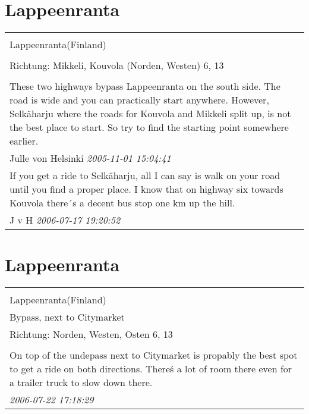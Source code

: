 \documentclass[a4paper,12pt]{article}
\begin{document}
\section{Lappeenranta}
\begin{tabular}{|p{13cm}|}
\hline\\
Lappeenranta(Finland)\\
\\
Richtung: Mikkeli, Kouvola (Norden, Westen) 6, 13 \\
\hline\\
These two highways bypass Lappeenranta on the south side. The road is wide and you can practically start anywhere. However, Selkäharju where the roads for Kouvola and Mikkeli split up, is not the best place to start. So try to find the starting point somewhere earlier. \\
Julle von Helsinki \textit{ 2005-11-01 15:04:41 }\\\hline If you get a ride to Selkäharju, all I can say is walk on your road until you find a proper place. I know that on highway six towards Kouvola there´s a decent bus stop one km up the hill. \\
J v H \textit{ 2006-07-17 19:20:52 }\\\hline
\end{tabular}


\section{Lappeenranta}
\begin{tabular}{|p{13cm}|}
\hline\\
Lappeenranta(Finland)\\
Bypass, next to Citymarket\\
Richtung: Norden, Westen, Osten 6, 13 \\
\hline\\
On top of the undepass next to Citymarket is propably the best spot to get a ride on both directions. There\'s a lot of room there even for a trailer truck to slow down there. \\
\textit{ 2006-07-22 17:18:29 }\\\hline
\end{tabular}
\end{document}
